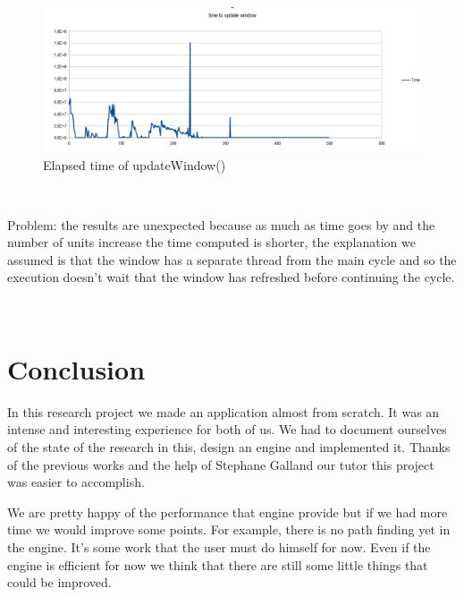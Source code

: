 \documentclass[a4paper,10pt]{book}
\begin{document}
~

\begin{figure}[ht]
 \includegraphics[scale=0.5]{updateWindow}
 \caption{Elapsed time of updateWindow()}
\end{figure}

~

Problem: the results are unexpected because as much as time goes by and the number of units increase the time computed is shorter, the explanation we assumed is that the window has a separate thread from the main cycle and so the execution doesn't wait that the window has refreshed before continuing the cycle.

~

\chapter {Conclusion}

In this research project we made an application almost from scratch. It was an intense and interesting experience for both of us. We had to document ourselves of the state of the research in this, design an engine and implemented it. Thanks of the previous works and the help of Stephane Galland our tutor this project was easier to accomplish. 

We are pretty happy of the performance that engine provide but if we had more time we would improve some points. For example, there is no path finding yet in the engine. It's some work that the user must do himself for now. Even if the engine is efficient for now we think that there are still some little things that could be improved.
\end{document}
